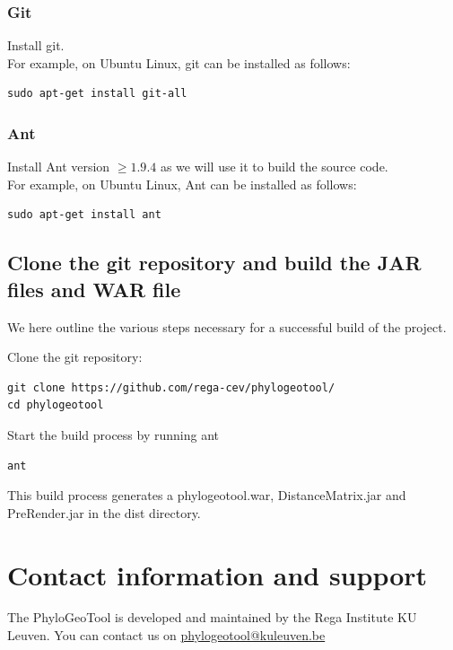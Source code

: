 \documentclass[a4paper, 11pt]{article} %
\begin{document}
\subsubsection*{Git}
Install git.\\

\noindent For example, on Ubuntu Linux, git can be installed as follows:
\begin{verbatim}
sudo apt-get install git-all
\end{verbatim}

\subsubsection*{Ant}
Install Ant version $\geq 1.9.4$ as we will use it to build the source code.\\

\noindent For example, on Ubuntu Linux, Ant can be installed as follows:
\begin{verbatim}
sudo apt-get install ant
\end{verbatim}

\subsection{Clone the git repository and build the JAR files and WAR file}
We here outline the various steps necessary for a successful build of the project.
\begin{itemize}
\item {Clone the git repository: 
\begin{verbatim}
git clone https://github.com/rega-cev/phylogeotool/
cd phylogeotool
\end{verbatim}
\item{Start the build process by running ant}
\begin{verbatim}
ant
\end{verbatim}
\item This build process generates a phylogeotool.war, DistanceMatrix.jar and PreRender.jar in the dist directory.
}
\end{itemize}


\section{Contact information and support }


The PhyloGeoTool is developed and maintained by the Rega Institute KU Leuven.
You can contact us on \href{mailto:phylogeotool@kuleuven.be}{phylogeotool@kuleuven.be}
\end{document}
